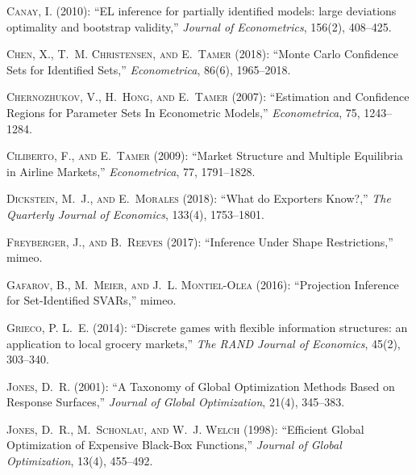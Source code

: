 \documentclass[letterpaper,11pt]{article}
\theoremstyle{myplain}
\theoremstyle{mydefinition}
\theoremstyle{myremark}
\numberwithin{equation}{section}
\numberwithin{figure}{section}
\begin{document}
\begin{thebibliography}{}
\textsc{Canay, I.}  (2010): ``EL inference for partially identified models:
  large deviations optimality and bootstrap validity,'' \emph{Journal of
  Econometrics}, 156(2), 408--425.

\textsc{Chen, X., T.~M. Christensen,  {\small and} E.~Tamer}  (2018): ``Monte
  Carlo Confidence Sets for Identified Sets,'' \emph{Econometrica}, 86(6),
  1965--2018.

\textsc{Chernozhukov, V., H.~Hong,  {\small and} E.~Tamer}  (2007):
  ``Estimation and Confidence Regions for Parameter Sets In Econometric
  Models,'' \emph{Econometrica}, 75, 1243--1284.

\textsc{Ciliberto, F.,  {\small and} E.~Tamer}  (2009): ``Market Structure and
  Multiple Equilibria in Airline Markets,'' \emph{Econometrica}, 77,
  1791--1828.

\textsc{Dickstein, M.~J.,  {\small and} E.~Morales}  (2018): ``What do
  Exporters Know?,'' \emph{The Quarterly Journal of Economics}, 133(4),
  1753--1801.

\textsc{Freyberger, J.,  {\small and} B.~Reeves}  (2017): ``Inference Under
  Shape Restrictions,'' mimeo.

\textsc{Gafarov, B., M.~Meier,  {\small and} J.~L. Montiel-Olea}  (2016):
  ``Projection Inference for Set-Identified SVARs,'' mimeo.

\textsc{Grieco, P. L.~E.}  (2014): ``Discrete games with flexible information
  structures: an application to local grocery markets,'' \emph{The RAND Journal
  of Economics}, 45(2), 303--340.

\textsc{Jones, D.~R.}  (2001): ``A Taxonomy of Global Optimization Methods
  Based on Response Surfaces,'' \emph{Journal of Global Optimization}, 21(4),
  345--383.

\textsc{Jones, D.~R., M.~Schonlau,  {\small and} W.~J. Welch}  (1998):
  ``Efficient Global Optimization of Expensive {Black-Box} Functions,''
  \emph{Journal of Global Optimization}, 13(4), 455--492.


\end{thebibliography}
\end{document}
